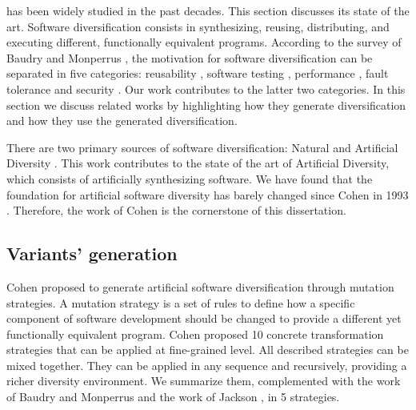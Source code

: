 has been widely studied in the past decades. This section discusses its state of the art.
Software diversification consists in synthesizing, reusing, distributing, and executing different, functionally equivalent programs. 
According to the survey of Baudry and Monperrus \cite{natural_diversity}, the motivation for software diversification can be separated in five categories: reusability \cite{pohl2005software}, software testing \cite{Chen2010AdaptiveRT}, performance \cite{10.1145/2025113.2025133}, fault tolerance \cite{1659219} and security \cite{cohen1993operating}. Our work contributes to the latter two categories. In this section we discuss related works by highlighting how they generate diversification and how they use the generated diversification. 







There are two primary sources of software diversification: Natural and Artificial Diversity \cite{natural_diversity}. This work contributes to the state of the art of Artificial Diversity, which consists of artificially synthesizing software. 
We have found that the foundation for artificial software diversity has barely changed since Cohen in 1993 \cite{cohen1993operating}. Therefore, the work of Cohen is the cornerstone of this dissertation.




\subsection*{Variants' generation}
Cohen \etal proposed to generate artificial software diversification through mutation strategies.
A mutation strategy is a set of rules to define how a specific component of software development should be changed to provide a different yet functionally equivalent program. Cohen \etal proposed 10 concrete transformation strategies that can be applied at fine-grained level. 
All described strategies can be mixed together. They can be applied in any sequence and recursively, providing a richer diversity environment. We summarize them, complemented with the work of Baudry and Monperrus \cite{natural_diversity} and the work of Jackson \etal \cite{jackson}, in 5 strategies.

